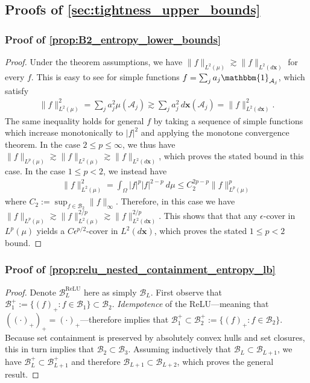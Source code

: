 \documentclass{article}
\DeclareMathOperator{\ReLU}{\mathrm{ReLU}}
\def\vx{{\bm{x}}}
\def\cA{{\mathcal{A}}}
\def\cB{{\mathcal{B}}}
\begin{document}
\begin{appendices}
\subsection{Proofs of \cref{sec:tightness_upper_bounds}} \label{appendix:proofs_lower_bound_props}
\subsubsection{Proof of \cref{prop:B2_entropy_lower_bounds}} \label{appendix:B2_entropy_lower_bounds}
    \begin{proof}
        Under the theorem assumptions, we have $\| f \|_{L^2(\mu)} \gtrsim \| f \|_{L^2(d \vx)}$ for every $f$. This is easy to see for simple functions $f = \sum_j a_j \mathbbm{1}_{\cA_j}$, which satisfy
        \begin{align}
            \| f \|_{L^2(\mu)}^2 = \sum_j a_j^2 \mu(\cA_j) \gtrsim \sum_j a_j^2 \, d \vx(\cA_j) = \| f \|_{L^2(d \vx)}^2. 
        \end{align}
        The same inequality holds for general $f$ by taking a sequence of simple functions which increase monotonically to $|f|^2$ and applying the monotone convergence theorem. In the case $2 \leq p \leq \infty$, we thus have $\| f \|_{L^p(\mu)} \gtrsim \| f \|_{L^2(\mu)} \gtrsim \| f \|_{L^2(d \vx)}$, which proves the stated bound in this case. In the case $1 \leq p < 2$, we instead have
        \begin{align}
            \| f \|_{L^2  ( \mu)}^2 = \int_\Omega |f|^p |f|^{2-p} \ d \mu \leq C_2^{2p-p} \| f \|_{L^p( \mu)}^p 
        \end{align}
        where $C_2 := \sup_{f \in \cB_2} \| f \|_{\infty}$. Therefore, in this case we have $\| f \|_{L^p(\mu)} \gtrsim \| f \|_{L^2(\mu)}^{2/p} \gtrsim \| f \|_{L^2(d \vx)}^{2/p}$. This shows that that any $\epsilon$-cover in $L^p(\mu)$ yields a $C \epsilon^{p/2}$-cover in $L^2( d \vx)$, which proves the stated $1 \leq p < 2$ bound.
    \end{proof}
    \subsubsection{Proof of \cref{prop:relu_nested_containment_entropy_lb}} \label{appendix:proof_relu_nested_containment_entropy_lb}
    \begin{proof}
        Denote $\cB_L^{\ReLU}$ here as simply $\cB_L$. First observe that $\cB_1^+ := \{ (f)_+: f \in \cB_1 \} \subset \cB_2$.  \textit{Idempotence} of the ReLU---meaning that $((\cdot)_+)_+ = (\cdot)_+$---therefore implies that $\cB_1^+ \subset \cB_2^+ := \{ (f)_+: f \in \cB_2 \}$. Because set containment is preserved by absolutely convex hulls and set closures, this in turn implies that $\cB_2 \subset \cB_3$. Assuming inductively that $\cB_L \subset \cB_{L+1}$, we have $\cB_L^+ \subset \cB_{L+1}^+$ and therefore $\cB_{L+1} \subset \cB_{L+2}$, which proves the general result.
    \end{proof}

\end{appendices}
\end{document}
